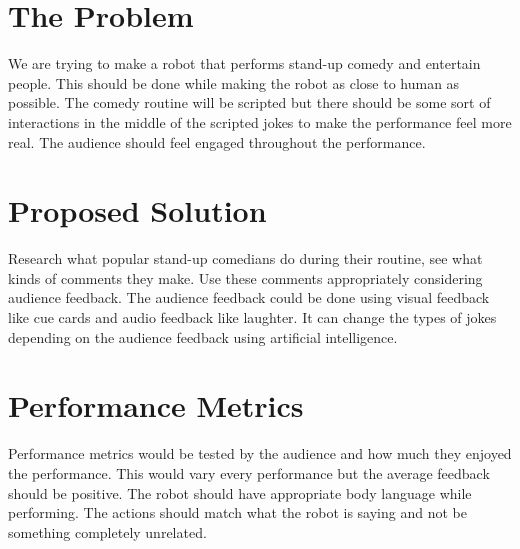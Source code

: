 \documentclass[onecolumn, draftclsnofoot,10pt, compsoc]{IEEEtran}
\begin{document}
\section{The Problem}
We are trying to make a robot that performs stand-up comedy and entertain people. This should be done while making the robot as close to human as possible. The comedy routine will be scripted but there should be some sort of interactions in the middle of the scripted jokes to make the performance feel more real. The audience should feel engaged throughout the performance.

\section{Proposed Solution}
Research what popular stand-up comedians do during their routine, see what kinds of comments they make. Use these comments appropriately considering audience feedback. The audience feedback could be done using visual feedback like cue cards and audio feedback like laughter. It can change the types of jokes depending on the audience feedback using artificial intelligence. 

\section{Performance Metrics}
Performance metrics would be tested by the audience and how much they enjoyed the performance. This would vary every performance but the average feedback should be positive. The robot should have appropriate body language while performing. The actions should match what the robot is saying and not be something completely unrelated. 
\end{document}
